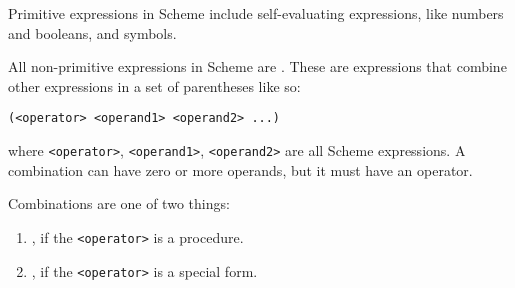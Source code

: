 Primitive expressions in Scheme include self-evaluating expressions, like
numbers and booleans, and symbols.

All non-primitive expressions in Scheme are . These are
expressions that combine other expressions in a set of parentheses like so:

\centerline{\lstinline{(<operator> <operand1> <operand2> ...)}}

where \texttt{<operator>}, \texttt{<operand1>}, \texttt{<operand2>} are all
Scheme expressions. A combination can have zero or more operands, but it must
have an operator.

Combinations are one of two things:
\begin{enumerate}
\item {}, if the \texttt{<operator>} is a
procedure.
\item {}, if the \texttt{<operator>} is
a special form.
\end{enumerate}
